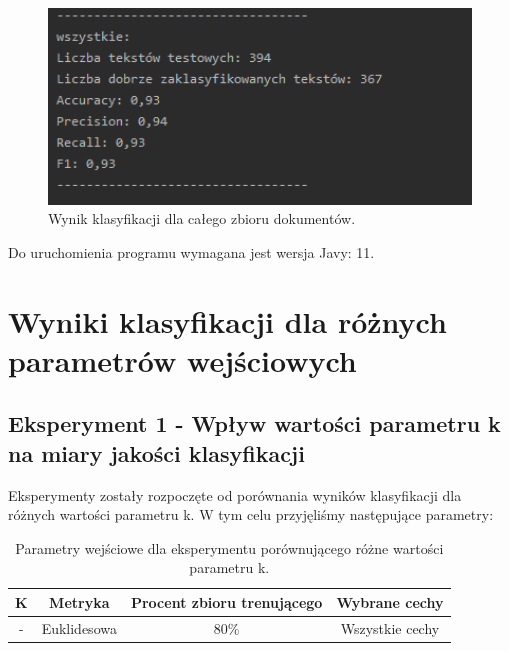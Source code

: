 \documentclass{classrep}
\begin{document}
\begin{figure}[h!]
 \centering
 \includegraphics[width=14cm]{wynik.png}
 \vspace{-0.3cm}
 \caption{Wynik klasyfikacji dla całego zbioru dokumentów.}
 \label{Wynik klasyfikacji.}
\end{figure}
\newpage

Do uruchomienia programu wymagana jest wersja Javy: 11. 



\section{Wyniki klasyfikacji dla różnych parametrów wejściowych}
\subsection{Eksperyment 1 - Wpływ wartości parametru k na miary jakości klasyfikacji}
\label{subsection:ex1}

Eksperymenty zostały rozpoczęte od porównania wyników klasyfikacji dla różnych wartości parametru k.
W tym celu przyjęliśmy następujące parametry:
 
\begin{table}[h!]
\caption{Parametry wejściowe dla eksperymentu porównującego różne wartości parametru k. }
\centering
\vspace{0.1cm}
 \begin{tabular}{c c c c}
    \textbf{K} & \textbf{Metryka}   & \textbf{Procent zbioru trenującego}  & \textbf{Wybrane cechy}   \\
\hline
- & Euklidesowa & 80\% &  Wszystkie cechy\\
\end {tabular}
\label {Parametry wejściowe dla eksperymentu porównującego różne wartości parametru k. }
\end{table}
\end{document}
